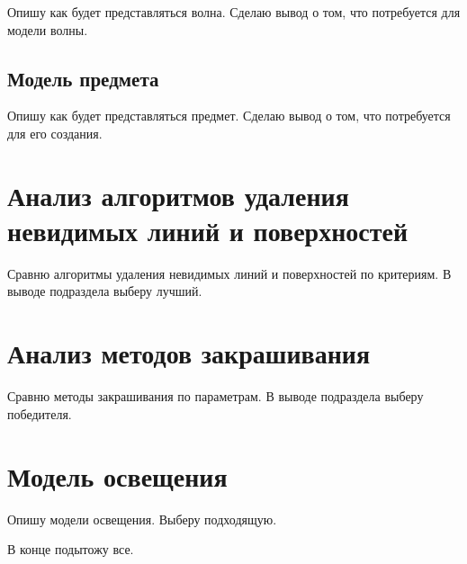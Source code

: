 Опишу как будет представляться волна. Сделаю вывод о том, что потребуется для модели волны.

\subsection{Модель предмета}

Опишу как будет представляться предмет. Сделаю вывод о том, что потребуется для его создания.

\section{Анализ алгоритмов удаления невидимых линий и поверхностей}

Сравню алгоритмы удаления невидимых линий и поверхностей по критериям. В выводе подраздела выберу лучший.

\section{Анализ методов закрашивания}

Сравню методы закрашивания по параметрам. В выводе подраздела выберу победителя.

\section{Модель освещения}

Опишу модели освещения. Выберу подходящую.

В конце подытожу все.